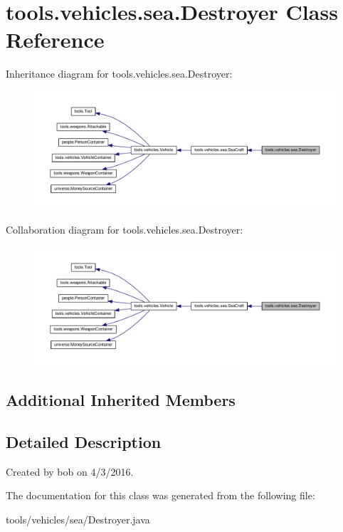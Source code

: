 \hypertarget{classtools_1_1vehicles_1_1sea_1_1_destroyer}{}\section{tools.\+vehicles.\+sea.\+Destroyer Class Reference}
\label{classtools_1_1vehicles_1_1sea_1_1_destroyer}


Inheritance diagram for tools.\+vehicles.\+sea.\+Destroyer\+:\nopagebreak
\begin{figure}[H]
\begin{center}
\leavevmode
\includegraphics[width=350pt]{classtools_1_1vehicles_1_1sea_1_1_destroyer__inherit__graph}
\end{center}
\end{figure}


Collaboration diagram for tools.\+vehicles.\+sea.\+Destroyer\+:\nopagebreak
\begin{figure}[H]
\begin{center}
\leavevmode
\includegraphics[width=350pt]{classtools_1_1vehicles_1_1sea_1_1_destroyer__coll__graph}
\end{center}
\end{figure}
\subsection*{Additional Inherited Members}


\subsection{Detailed Description}
Created by bob on 4/3/2016. 

The documentation for this class was generated from the following file\+:\begin{DoxyCompactItemize}
\item 
tools/vehicles/sea/Destroyer.\+java\end{DoxyCompactItemize}
